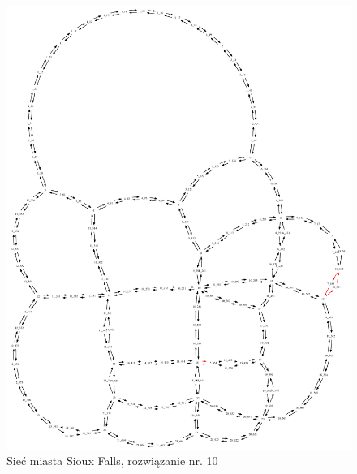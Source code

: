 \documentclass[twoside,12pt]{report}
\begin{document}
\begin{figure}[ht]
\centering
\includegraphics[totalheight=0.580\textheight, angle=90]{img/sioux-out/10/network2}
\caption{Sieć miasta Sioux Falls, rozwiązanie nr. 10}
\label{sioux10}
\end{figure}
\end{document}
